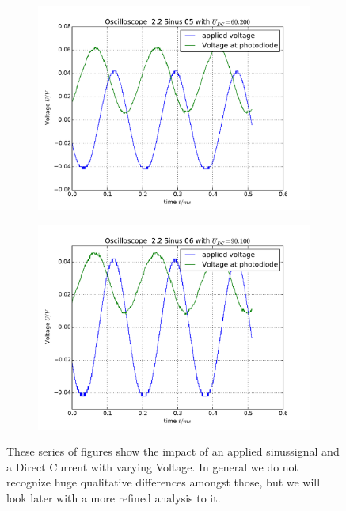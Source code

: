 \begin{figure}
\begin{subfigure}[b]{\picwidth}
        \includegraphics[width=\textwidth]{analysis/figures/22sinus05}
        \caption{}
    \end{subfigure}
    \begin{subfigure}[b]{\picwidth}
        \includegraphics[width=\textwidth]{analysis/figures/22sinus06}
        \caption{}
    \end{subfigure}

    \caption{These series of figures show the impact of
        an applied sinussignal and a Direct Current with
        varying Voltage. In general we do not recognize huge 
        qualitative differences amongst those, but we will look
        later with a more refined analysis to it.}
    \label{fig:sinus1}
\end{figure}
\flushleft


